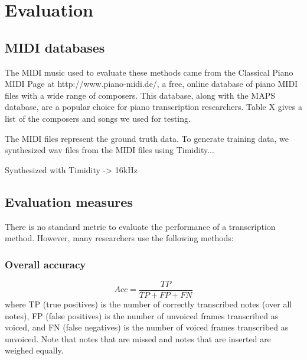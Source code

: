 \documentclass[5p]{elsarticle}
\begin{document}
\section{Evaluation}

\subsection{MIDI databases}

The MIDI music used to evaluate these methods came from the Classical Piano MIDI Page at http://www.piano-midi.de/, a free, online database of piano MIDI files with a wide range of composers. This database, along with the MAPS database, are a popular choice for piano transcription researchers. Table X gives a list of the composers and songs we used for testing. 

The MIDI files represent the ground truth data. To generate training data, we synthesized wav files from the MIDI files using Timidity...

Synthesized with Timidity -> 16kHz


\subsection{Evaluation measures}


There is no standard metric to evaluate the performance of a transcription method. However, many researchers use the following methods:

\subsubsection{Overall accuracy}
$$Acc = \frac{TP}{TP+FP+FN} $$
where TP (true positives) is the number of correctly transcribed notes (over all notes), FP (false positives) is the number of unvoiced frames transcribed as voiced, and FN (false negatives) is the number of voiced frames transcribed as unvoiced. Note that notes that are missed and notes that are inserted are weighed equally.
\end{document}
